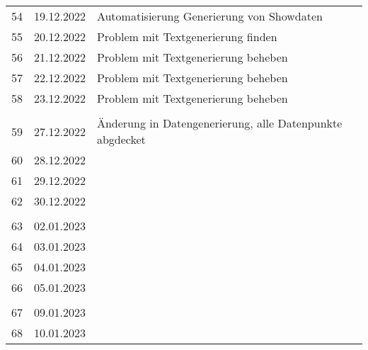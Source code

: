 \begin{longtable}{|l|c|l|}
&               &                                                       \\ \hline 
54  & 19.12.2022    &  Automatisierung Generierung von Showdaten                                                    \\ \hline 
55  & 20.12.2022    &  Problem mit Textgenerierung finden                                                     \\ \hline 
56  & 21.12.2022    &  Problem mit Textgenerierung beheben                                                    \\ \hline 
57  & 22.12.2022    &  Problem mit Textgenerierung beheben                                                        \\ \hline 
58  & 23.12.2022    &  Problem mit Textgenerierung beheben                                                        \\ \hline 
&               &                                                       \\ \hline 
59  & 27.12.2022    & Änderung in Datengenerierung, alle Datenpunkte abgdecket                                                      \\ \hline 
60  & 28.12.2022    &                                                       \\ \hline 
61  & 29.12.2022    &                                                       \\ \hline 
62  & 30.12.2022    &                                                       \\ \hline 
&               &                                                       \\ \hline 
63  & 02.01.2023    &                                                       \\ \hline 
64  & 03.01.2023    &                                                       \\ \hline 
65  & 04.01.2023    &                                                       \\ \hline 
66  & 05.01.2023    &                                                       \\ \hline 
&               &                                                       \\ \hline 
67  & 09.01.2023    &                                                       \\ \hline 
68  & 10.01.2023    &                                                       \\ \hline 

\end{longtable}
